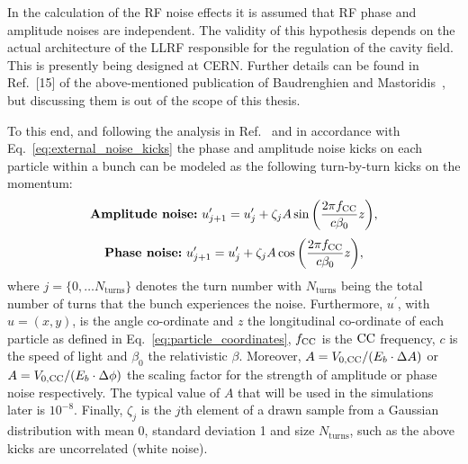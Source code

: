 In the calculation of the RF noise effects it is assumed that RF phase and amplitude noises are independent. The validity of this hypothesis depends on the actual architecture of the LLRF responsible for the regulation of the cavity field. This is presently being designed at CERN. Further details can be found in Ref.~[15] of the above-mentioned publication of Baudrenghien and Mastoridis~\cite{PhysRevSTAB.18.101001}, but discussing them is out of the scope of this thesis.
 

To this end, and following the analysis in Ref.~\cite{PhysRevSTAB.18.101001} and in accordance with Eq.~\eqref{eq:external_noise_kicks} the phase and amplitude noise kicks on each particle within a bunch can be modeled as the following turn-by-turn kicks on the momentum: %
\begin{equation}\label{eq:amplitude_noise_kick}
  \textbf{\textrm{Amplitude noise:}} \  u^\prime_{j+1} =  u^\prime_j + \zeta_j A \sin{\left (  \frac{2 \pi {f_\mathrm{CC}}}{c \beta_0}z   \right )},
\end{equation}
\begin{equation}\label{eq:phase_noise_kick}
    \textbf{\textrm{Phase noise:}} \ u^\prime_{j+1} =  u^\prime_j + \zeta_j A \cos{\left (  \frac{2 \pi {f_\mathrm{CC}}}{c \beta_0}z   \right )},
\end{equation}
where $j=\{ 0,\dots N_\mathrm{turns} \}$ denotes the turn number with $N_\mathrm{turns}$ being the total number of turns that the bunch experiences the noise. Furthermore, $u^\prime$, with $u=(x,y)$, is the angle co-ordinate and $z$ the longitudinal co-ordinate of each particle as defined in Eq.~\eqref{eq:particle_coordinates}, ${f_\mathrm{CC}}$ is the ${\mathrm{CC}}$ frequency, $c$ is the speed of light and $\beta_0$ the relativistic $\beta$. Moreover, $A={V_\mathrm{0, CC}} /(E_b \cdot \Delta A )$ or $A={V_\mathrm{0, CC}} /(E_b \cdot \Delta \phi )$ the scaling factor for the strength of amplitude or phase noise respectively. The typical value of $A$ that will be used in the simulations later is $10^{-8}$. Finally, $\zeta_j$ is the $j$th element of a drawn sample from a Gaussian distribution with mean 0, standard deviation 1 and size $N_\mathrm{turns}$, such as the above kicks are uncorrelated (white noise).

